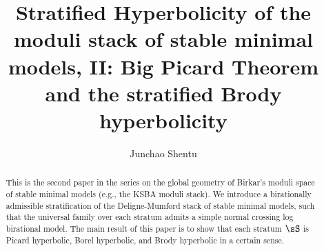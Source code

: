 \documentclass[11pt,letterpaper]{amsart}
\numberwithin{equation}{section}
\begin{document}
	\title[Stratified Hyperbolicity of the moduli stack of stable minimal models] {Stratified Hyperbolicity of the moduli stack of stable minimal models, II: Big Picard Theorem and the stratified Brody hyperbolicity}
	
	\author[Junchao Shentu]{Junchao Shentu}
	\address{School of Mathematical Sciences,
		University of Science and Technology of China, Hefei, 230026, China}
	
	
	\begin{abstract}
		This is the second paper in the series on the global geometry of Birkar's moduli space of stable minimal models (e.g., the KSBA moduli stack). We introduce a birationally admissible stratification of the Deligne-Mumford stack of stable minimal models, such that the universal family over each stratum admits a simple normal crossing log birational model. The main result of this paper is to show that each stratum $\sS$ is Picard hyperbolic, Borel hyperbolic, and Brody hyperbolic in a certain sense.
	\end{abstract}
	
	\maketitle
	
\end{document}
